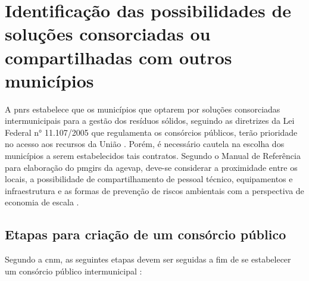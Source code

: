 \newpage
\FloatBarrier
\section{Identificação das possibilidades de soluções consorciadas ou compartilhadas com outros municípios}
\label{sec:sol_cons}


A \gls{pnrs} estabelece que os municípios que optarem por soluções consorciadas intermunicipais para a gestão dos resíduos sólidos, seguindo as diretrizes da Lei Federal n° 11.107/2005 que regulamenta os consórcios públicos, terão prioridade no acesso aos recursos da União \cite{brasil:12305}. Porém, é necessário cautela na escolha dos municípios a serem estabelecidos tais contratos. Segundo o Manual de Referência para elaboração do \gls{pmgirs} da \gls{agevap}, deve-se considerar a proximidade entre os locais, a possibilidade de compartilhamento de pessoal técnico, equipamentos e infraestrutura e as formas de prevenção de riscos ambientais com a perspectiva de economia de escala \cite{agevap_manual_2019}.

\subsection{Etapas para criação de um consórcio público}

Segundo a \gls{cnm}, as seguintes etapas devem ser seguidas a fim de se estabelecer um consórcio público intermunicipal \cite{consorcio_publico}: 


